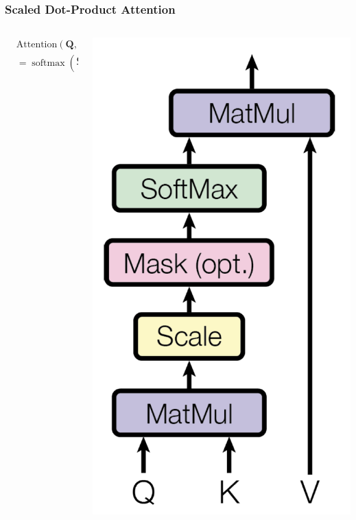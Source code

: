 \documentclass{beamer}
\DeclareMathOperator*{\softmax}{softmax}
\begin{document}
\begin{frame}
  \frametitle{Scaled Dot-Product Attention}

  \begin{columns}
    \begin{column}{0.5\textwidth}
      \begin{align*}
        &\text{Attention}(\bm{Q},\bm{K},\bm{V}) \\
        &=
        \softmax\left(\frac{\bm{Q}\bm{K}^T}{\sqrt{d_k}}\right)\bm{V}
      \end{align*}
    \end{column}
    \begin{column}{0.5\textwidth}
      \begin{center}
        \includegraphics[height=0.8\textheight]{figs/vaswani2017fig2a.png}
        

\end{center}
\end{column}
\end{columns}
\end{frame}
\end{document}
